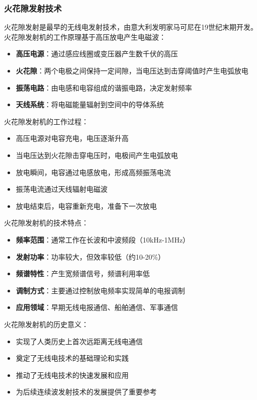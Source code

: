 \documentclass[12pt,UTF8]{ctexbook}
\begin{document}
\subsubsection{火花隙发射技术}

火花隙发射是最早的无线电发射技术，由意大利发明家马可尼在19世纪末期开发。火花隙发射机的工作原理基于高压放电产生电磁波：

\begin{itemize}[leftmargin=3.5em]
    \item \textbf{高压电源}：通过感应线圈或变压器产生数千伏的高压
    \item \textbf{火花隙}：两个电极之间保持一定间隙，当电压达到击穿阈值时产生电弧放电
    \item \textbf{振荡电路}：由电感和电容组成的谐振电路，决定发射频率
    \item \textbf{天线系统}：将电磁能量辐射到空间中的导体系统
\end{itemize}

火花隙发射机的工作过程：
\begin{itemize}[leftmargin=3.5em]
    \item 高压电源对电容充电，电压逐渐升高
    \item 当电压达到火花隙击穿电压时，电极间产生电弧放电
    \item 放电瞬间，电容通过电感放电，形成高频振荡电流
    \item 振荡电流通过天线辐射电磁波
    \item 放电结束后，电容重新充电，准备下一次放电
\end{itemize}

火花隙发射机的技术特点：
\begin{itemize}[leftmargin=3.5em]
    \item \textbf{频率范围}：通常工作在长波和中波频段（10kHz-1MHz）
    \item \textbf{发射功率}：功率较大，但效率较低（约10-20\%）
    \item \textbf{频谱特性}：产生宽频谱信号，频谱利用率低
    \item \textbf{调制方式}：主要通过控制放电频率实现简单的电报调制
    \item \textbf{应用领域}：早期无线电报通信、船舶通信、军事通信
\end{itemize}

火花隙发射机的历史意义：
\begin{itemize}[leftmargin=3.5em]
    \item 实现了人类历史上首次远距离无线电通信
    \item 奠定了无线电技术的基础理论和实践
    \item 推动了无线电技术的快速发展和应用
    \item 为后续连续波发射技术的发展提供了重要参考
\end{itemize}
\end{document}
